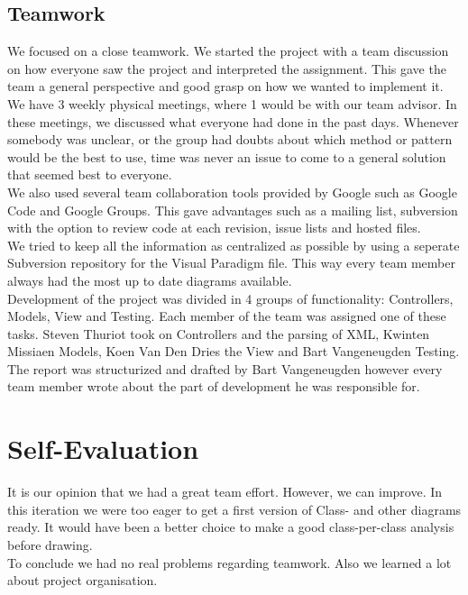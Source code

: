 \documentclass[a4paper,11pt]{article}
\begin{document}
		\subsection{Teamwork}
		We focused on a close teamwork. We started the project with a team discussion on how everyone saw the project and interpreted the assignment. This gave the team a general perspective and good grasp on how we wanted to implement it.\\
		We have 3 weekly physical meetings, where 1 would be with our team advisor. In these meetings, we discussed what everyone had done in the past days. Whenever somebody was unclear, or the group had doubts about which method or pattern would be the best to use, time was never an issue to come to a general solution that seemed best to everyone.\\
		We also used several team collaboration tools provided by Google such as Google Code and Google Groups. This gave advantages such as a mailing list, subversion with the option to review code at each revision, issue lists and hosted files.\\
		We tried to keep all the information as centralized as possible by using a seperate Subversion repository for the Visual Paradigm file. This way every team member always had the most up to date diagrams available.\\
		Development of the project was divided in 4 groups of functionality: Controllers, Models, View and Testing. Each member of the team was assigned one of these tasks. Steven Thuriot took on Controllers and the parsing of XML, Kwinten Missiaen Models, Koen Van Den Dries the View and Bart Vangeneugden Testing. The report was structurized and drafted by Bart Vangeneugden however every team member wrote about the part of development he was responsible for.
	\section{Self-Evaluation}
	It is our opinion that we had a great team effort. However, we can improve. In this iteration we were too eager to get a first version of Class- and other diagrams ready. It would have been a better choice to make a good class-per-class analysis before drawing.\\
	To conclude we had no real problems regarding teamwork. Also we learned a lot about project organisation.
\end{document}
